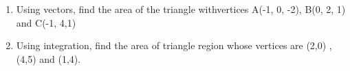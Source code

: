 \begin{enumerate}
\item Using vectors, find the area of the triangle withvertices A(-1, 0, -2), B(0, 2, 1) and C(-1, 4,1)
\item Using integration, find the area of triangle region whose vertices are (2,0) , (4,5) and (1,4).
\end{enumerate}

